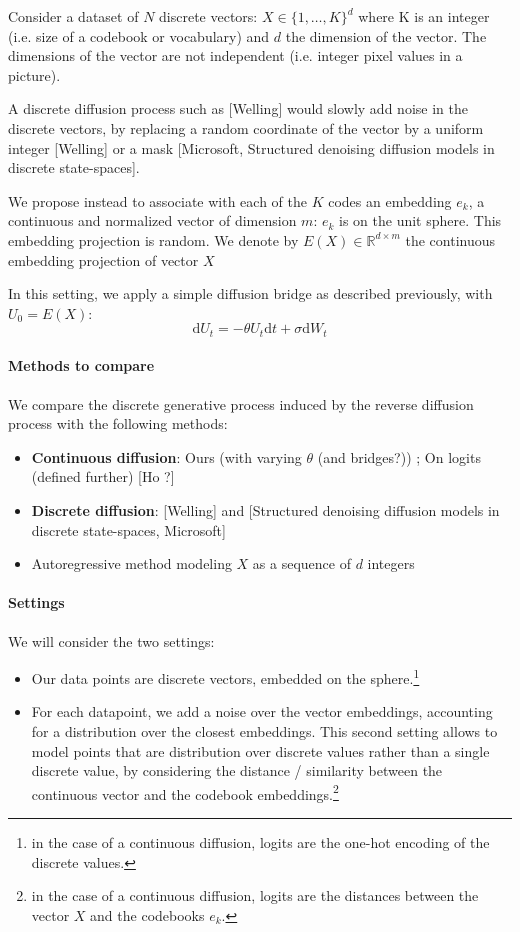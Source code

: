 \documentclass{article}
\newcommand{\rset}{\ensuremath{\mathbb{R}}}
\begin{document}
Consider a dataset of $N$ discrete vectors: $X \in \{1,\ldots,K\}^d$ where K is an integer (i.e. size of a codebook or vocabulary) and $d$ the dimension of the vector. The dimensions of the vector are not independent (i.e. integer pixel values in a picture).

A discrete diffusion process such as [Welling] would slowly add noise in the discrete vectors, by replacing a random coordinate of the vector by a uniform integer [Welling] or a mask [Microsoft, Structured denoising diffusion models in discrete state-spaces].

We propose instead to associate with each of the $K$ codes an embedding $e_k$, a continuous and normalized vector of dimension $m$: $e_k$ is on the unit sphere. This embedding projection is random. We denote by $E(X) \in \rset^{d \times m}$ the continuous embedding projection of vector $X$

In this setting, we apply a simple diffusion bridge as described previously, with $U_0 = E(X)$:
$$
\mathrm{d}U_t = -\theta U_t \mathrm{d}t + \sigma\mathrm{d}W_t
$$

\paragraph{Methods to compare} We compare the discrete generative process induced by the reverse diffusion process with the following methods:

\begin{itemize}
	\item \textbf{Continuous diffusion}: Ours (with varying $\theta$ (and bridges?)) ; On logits (defined further) [Ho ?]
	\item \textbf{Discrete diffusion}: [Welling] and [Structured denoising diffusion models in discrete state-spaces, Microsoft]
	\item Autoregressive method modeling $X$ as a sequence of $d$ integers
\end{itemize}

\paragraph{Settings} We will consider the two settings:

\begin{itemize}
	\item Our data points are discrete vectors, embedded on the sphere.\footnote{in the case of a continuous diffusion, logits are the one-hot encoding of the discrete values.}
	\item For each datapoint, we add a noise over the vector embeddings, accounting for a distribution over the closest embeddings. This second setting allows to model points that are distribution over discrete values rather than a single discrete value, by considering the distance / similarity between the continuous vector and the codebook embeddings.\footnote{in the case of a continuous diffusion, logits are the distances between the vector $X$ and the codebooks $e_k$.}
\end{itemize}
\end{document}
